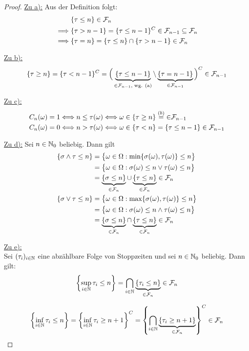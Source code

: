 \begin{proof}
	\underline{Zu a):} Aus der Definition folgt:
	\begin{align*}
		&\{\tau \leq n\} \in \mathcal{F}_n \\
		\implies & \{\tau > n-1\} = \{\tau \leq n-1\}^C \in \mathcal{F}_{n-1} \subseteq \mathcal{F}_n \\
		\implies & \{\tau = n\} = \{\tau \leq n\} \cap \{\tau > n-1\} \in \mathcal{F}_n
	\end{align*}

	\underline{Zu b):}
	\begin{align*}
		\{\tau \geq n \} =\lbrace\tau <n-1\rbrace^C= \Big(\underbrace{\{\tau \leq n-1 \}}_{\in\mathcal{F}_{n-1}\text{, wg. (a)}} \setminus \underbrace{\{\tau = n-1 \}}_{\in\mathcal{F}_{n-1}} \Big)^C \in \mathcal{F}_{n-1}
	\end{align*}
	
	\underline{Zu c):}
	\begin{align*}
		C_n(\omega)&=1\Longleftrightarrow n\leq\tau(\omega)\Longleftrightarrow
		\omega\in\lbrace\tau\geq n\rbrace\stackrel{(b)}{=}{\in}\mathcal{F}_{n-1}\\
		C_n(\omega)&=0\Longleftrightarrow
		n>\tau(\omega)\Longleftrightarrow
		\omega\in\lbrace\tau<n\rbrace=\lbrace\tau\leq n-1\rbrace\in\mathcal{F}_{n-1}
	\end{align*}

	\underline{Zu d):} Sei $n\in\mathbb{N}_0$ beliebig. Dann gilt
	\begin{align*}
		\{\sigma \wedge \tau \leq n \}
		&=\big\lbrace\omega\in\Omega:\min\lbrace\sigma(\omega),\tau(\omega)\rbrace\leq n\big\rbrace\\
		&=\big\lbrace\omega\in\Omega:\sigma(\omega)\leq n\vee\tau(\omega)\leq n\big\rbrace\\
		&=\underbrace{\{\sigma \leq n\}}_{\in \mathcal{F}_n} \cup \underbrace{\{\tau \leq n\}}_{\in\mathcal{F}_n} \in \mathcal{F}_n \\
		\{\sigma \vee \tau \leq n \}
		&=\big\lbrace\omega\in\Omega:\max\lbrace\sigma(\omega),\tau(\omega)\rbrace\leq n\big\rbrace\\
		&=\big\lbrace\omega\in\Omega:\sigma(\omega)\leq n\wedge\tau(\omega)\leq n\big\rbrace\\
		&=\underbrace{\{\sigma \leq n\}}_{\in \mathcal{F}_n} \cap \underbrace{\{\tau \leq n\}}_{\in\mathcal{F}_n} \in \mathcal{F}_n \\
	\end{align*}

	\underline{Zu e):}\\
	Sei $(\tau_i)_{i\in\mathbb{N}}$ eine abzählbare Folge von Stoppzeiten und sei $n\in\mathbb{N}_0$ beliebig. 
	Dann gilt:
	\begin{align*}
		\left\lbrace\sup_{i\in\mathbb{N}} \tau_{i} \leq n\right\rbrace
		= \bigcap_{i\in\mathbb{N}}\underbrace{\{\tau_i \leq n\}}_{\in\mathcal{F}_n} \in \mathcal{F}_n
	\end{align*}
	
	\begin{align*}
		\left\lbrace\inf_{i\in\mathbb{N}} \tau_{i} \leq n\right\rbrace =
		\left\lbrace\inf_{i\in\mathbb{N}} \tau_{i} \geq n+1\right\rbrace^C = \left\lbrace\bigcap_{i\in\mathbb{N}}\underbrace{\{\tau_i \geq n+1\}}_{\in\mathcal{F}_n}\right\rbrace^C \in \mathcal{F}_n
	\end{align*}
\end{proof}

